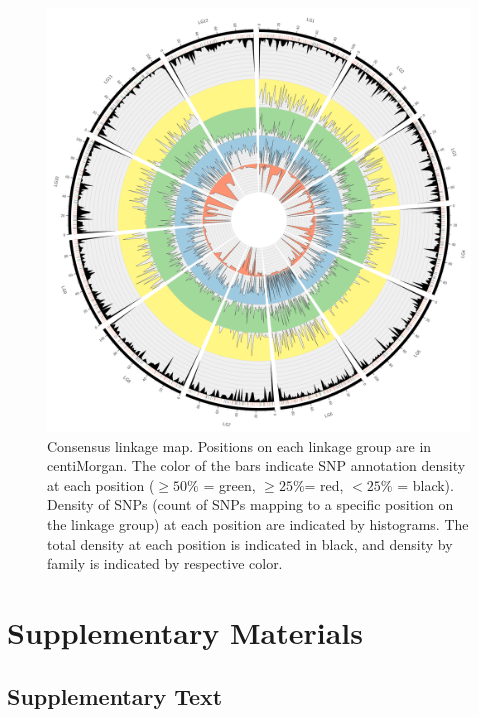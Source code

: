 \documentclass[smallextended]{svjour3}
\newcommand{\beginsupplement}{%
        \setcounter{table}{0}
        \renewcommand{\thetable}{S\arabic{table}}
        \setcounter{figure}{0}
        \renewcommand{\thefigure}{S\arabic{figure}}
        \renewcommand{\thesection}{S\arabic{section}}
        \renewcommand{\thesubsection}{S\arabic{subsection}} 
     }
\begin{document}
\begin{figure}[ht]
  \centering
  \includegraphics[width=\textwidth]{circos_con}
  \caption{Consensus linkage map.  Positions on each linkage group are in centiMorgan. The color of the bars indicate SNP
annotation density at each position ($\ge 50\%$ = green, $\ge 25\%$= red, $< 25\%$ = black). Density of SNPs (count of SNPs mapping 
to a specific position on the linkage group) at each position are indicated by histograms. The total density at each position is indicated 
in black, and density by family is indicated by respective color.}
  \label{f:con}
\end{figure}

\clearpage

\beginsupplement

\section*{Supplementary Materials}

\subsection*{Supplementary Text}\label{ss:supp}
\end{document}
